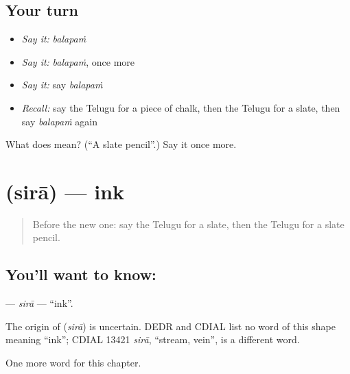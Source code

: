 \subsection*{Your turn}
\begin{itemize}
\raggedright
  \item \emph{Say it:} \emph{balapaṁ}
  \item \emph{Say it:} \emph{balapaṁ}, once more
  \item \emph{Say it:} say \emph{balapaṁ}
  \item \emph{Recall:} say the Telugu for a piece of chalk, then the Telugu for a slate, then say \emph{balapaṁ} again
\end{itemize}

\begin{tcolorbox}[breakable,colback=teal!4,colframe=teal!35!black,title={Before you move on}]
What does  mean? (\textquotedblleft{}A slate pencil\textquotedblright{}.) Say it once more.
\end{tcolorbox}
\section[\texorpdfstring{\te{సిరా} (sirā)}{సిరా (sirā)}]{ (sirā) — ink}

\label{lesson:TE-C313-sira}



\begin{quote}
Before the new one: say the Telugu for a slate, then the Telugu for a slate pencil.
\end{quote}

\subsection*{You'll want to know: }
\textbf{} — \emph{sirā} — \textquotedblleft{}ink\textquotedblright{}.

\begin{cousinweb}
The origin of \textbf{} (\emph{sirā}) is uncertain. DEDR and CDIAL list no word of this shape meaning \textquotedblleft{}ink\textquotedblright{}; CDIAL 13421 \emph{sirā}, \textquotedblleft{}stream, vein\textquotedblright{}, is a different word.
\end{cousinweb}

\begin{grammarlens}[title={What you've built}]
One more word for this chapter.
\end{grammarlens}


